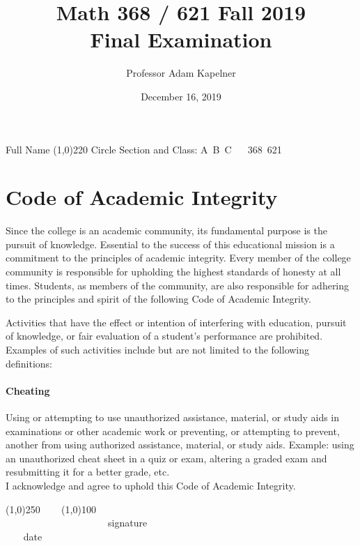\documentclass[12pt]{article}
\title{Math 368 / 621 Fall 2019 \\ Final Examination}
\author{Professor Adam Kapelner}
\date{December 16, 2019}
\begin{document}
\maketitle

\noindent Full Name \line(1,0){220} Circle Section and Class: A~B~C ~~ 368~621 

\thispagestyle{empty}

\section*{Code of Academic Integrity}

\footnotesize
Since the college is an academic community, its fundamental purpose is the pursuit of knowledge. Essential to the success of this educational mission is a commitment to the principles of academic integrity. Every member of the college community is responsible for upholding the highest standards of honesty at all times. Students, as members of the community, are also responsible for adhering to the principles and spirit of the following Code of Academic Integrity.

Activities that have the effect or intention of interfering with education, pursuit of knowledge, or fair evaluation of a student's performance are prohibited. Examples of such activities include but are not limited to the following definitions:

\paragraph{Cheating} Using or attempting to use unauthorized assistance, material, or study aids in examinations or other academic work or preventing, or attempting to prevent, another from using authorized assistance, material, or study aids. Example: using an unauthorized cheat sheet in a quiz or exam, altering a graded exam and resubmitting it for a better grade, etc.
\\

\noindent I acknowledge and agree to uphold this Code of Academic Integrity. \\

\begin{center}
\line(1,0){250} ~~~ \line(1,0){100}\\
~~~~~~~~~~~~~~~~~~~~~signature~~~~~~~~~~~~~~~~~~~~~~~~~~~~~~~~~~~~~~~~~~~~~ date
\end{center}

\normalsize

\vspace{-1cm}
\end{document}
